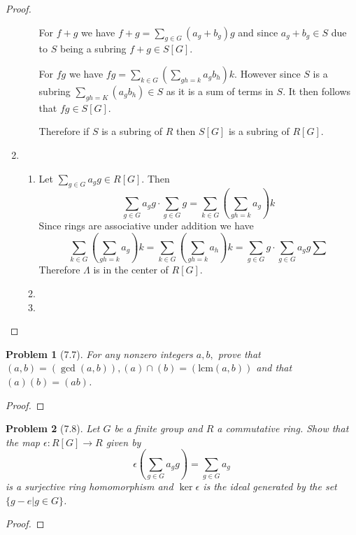 \documentclass[10pt]{article}
\newcommand{\sk}{\vskip 10mm}
\theoremstyle{plain}
\newtheorem{problem}{Problem}
\theoremstyle{remark}
\begin{document}
\begin{proof}
\begin{enumerate}
\begin{enumerate}
      For $f+g$ we have $f+g=\sum_{g\in G}(a_g+b_g)g$ and since $a_g+b_g\in S$ due to
      $S$ being a subring $f+g\in S[G]$.

      For $fg$ we have $fg=\sum_{k\in G}\left(\sum_{gh=k}a_gb_h\right)k$. However
      since $S$ is a subring $\sum_{gh=K}(a_gb_h)\in S$ as it is a sum of terms in $S$.
      It then follows that $fg\in S[G]$.

      Therefore if $S$ is a subring of $R$ then $S[G]$ is a subring of $R[G]$.
    \end{enumerate}
  \item
    \begin{enumerate}
    \item Let $\sum_{g\in G}a_gg\in R[G]$. Then
      \[ \sum_{g\in G}a_gg\cdot\sum_{g\in G}g=\sum_{k\in G}\left(\sum_{gh=k}a_g\right)k \]
        Since rings are associative under addition we have
      \[ \sum_{k\in G}\left(\sum_{gh=k}a_g\right)k= \sum_{k\in G}\left(\sum_{gh=k}a_h\right)k
        = \sum_{g\in G}g\cdot\sum_{g\in G}a_gg\sum\]
      Therefore $\Lambda$ is in the center of $R[G]$.
    \item
    \item
    \end{enumerate}
  \end{enumerate}
\end{proof}

\sk

\begin{problem}[7.7]
  For any nonzero integers $a,b,$ prove that
  $(a,b)=(\gcd(a,b)),(a)\cap(b)=(\text{lcm}(a,b))$
  and that $(a)(b)=(ab)$.
\end{problem}

\begin{proof}
  
\end{proof}

\sk

\begin{problem}[7.8]
  Let $G$ be a finite group and $R$ a commutative ring. Show that the map
  $\epsilon:R[G]\rightarrow R$ given by
  \[ \epsilon\left(\sum_{g\in G}a_gg\right)=\sum_{g\in G}a_g \]
  is a surjective ring homomorphism and $\ker \epsilon$ is the ideal generated by
  the set $\{g-e|g\in G\}$.
\end{problem}

\begin{proof}
  
\end{proof}
\end{document}
